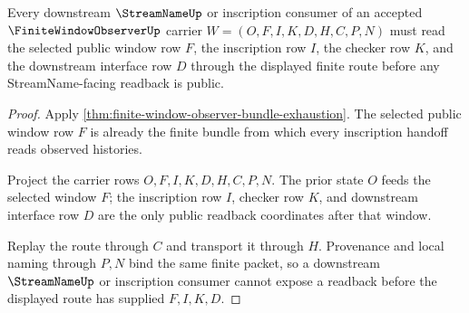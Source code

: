 \begin{theorem}
\label{thm:finite-window-observer-streamname-window-readback}
Every downstream $\StreamNameUp$ or inscription consumer of an accepted $\FiniteWindowObserverUp$ carrier $W=(O,F,I,K,D,H,C,P,N)$ must read the selected public window row $F$, the inscription row $I$, the checker row $K$, and the downstream interface row $D$ through the displayed finite route before any StreamName-facing readback is public.
\end{theorem}
\begin{proof}
Apply \autoref{thm:finite-window-observer-bundle-exhaustion}. The selected public window row $F$ is already the finite bundle from which every inscription handoff reads observed histories.

Project the carrier rows $O,F,I,K,D,H,C,P,N$. The prior state $O$ feeds the selected window $F$; the inscription row $I$, checker row $K$, and downstream interface row $D$ are the only public readback coordinates after that window.

Replay the route through $C$ and transport it through $H$. Provenance and local naming through $P,N$ bind the same finite packet, so a downstream $\StreamNameUp$ or inscription consumer cannot expose a readback before the displayed route has supplied $F,I,K,D$.
\end{proof}

